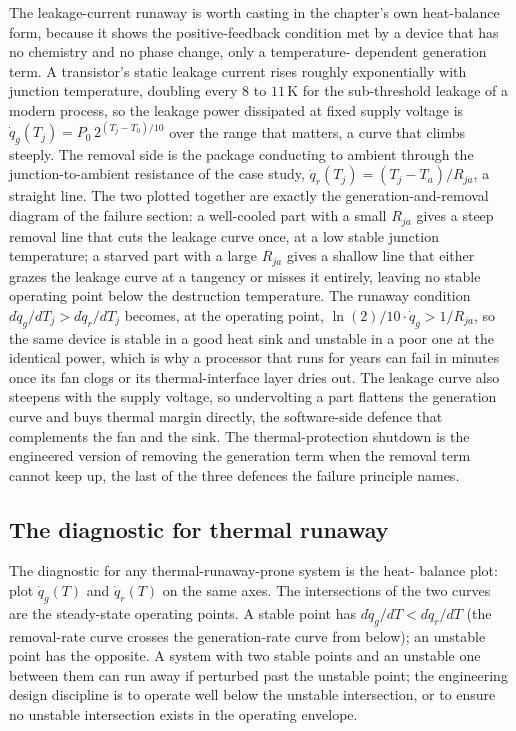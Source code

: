 The leakage-current runaway is worth casting in the chapter's own
heat-balance form, because it shows the positive-feedback condition met by
a device that has no chemistry and no phase change, only a temperature-
dependent generation term. A transistor's static leakage current rises
roughly exponentially with junction temperature, doubling every $8$ to
$11\,\si{\kelvin}$ for the sub-threshold leakage of a modern process, so
the leakage power dissipated at fixed supply voltage is $\dot{q}_g(T_j) =
P_0\,2^{(T_j - T_0)/10}$ over the range that matters, a curve that climbs
steeply. The removal side is the package conducting to ambient through the
junction-to-ambient resistance of the case study, $\dot{q}_r(T_j) = (T_j -
T_a)/R_{ja}$, a straight line. The two plotted together are exactly the
generation-and-removal diagram of the failure section: a well-cooled part
with a small $R_{ja}$ gives a steep removal line that cuts the leakage
curve once, at a low stable junction temperature; a starved part with a
large $R_{ja}$ gives a shallow line that either grazes the leakage curve
at a tangency or misses it entirely, leaving no stable operating point
below the destruction temperature. The runaway condition
$d\dot{q}_g/dT_j > d\dot{q}_r/dT_j$ becomes, at the operating point,
$\ln(2)/10\cdot\dot{q}_g > 1/R_{ja}$, so the same device is stable in a
good heat sink and unstable in a poor one at the identical power, which is
why a processor that runs for years can fail in minutes once its fan
clogs or its thermal-interface layer dries out. The leakage curve also
steepens with the supply voltage, so undervolting a part flattens the
generation curve and buys thermal margin directly, the software-side
defence that complements the fan and the sink. The thermal-protection
shutdown is the engineered version of removing the generation term when the
removal term cannot keep up, the last of the three defences the failure
principle names.

\subsection{The diagnostic for thermal runaway}

The diagnostic for any thermal-runaway-prone system is the heat-
balance plot: plot $\dot{q}_g(T)$ and $\dot{q}_r(T)$ on the same
axes. The intersections of the two curves are the steady-state
operating points. A stable point has $d\dot{q}_g/dT < d\dot{q}_r/dT$
(the removal-rate curve crosses the generation-rate curve from
below); an unstable point has the opposite. A system with two stable
points and an unstable one between them can run away if perturbed
past the unstable point; the engineering design discipline is to
operate well below the unstable intersection, or to ensure no
unstable intersection exists in the operating envelope.

